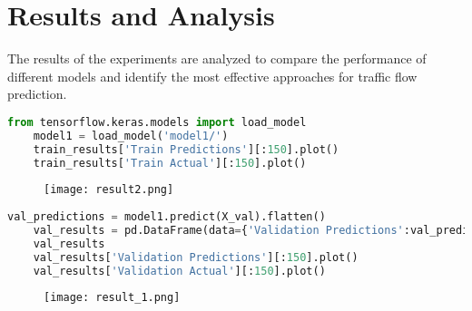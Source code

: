 \section{Results and Analysis}

The results of the experiments are analyzed to compare the performance of different models and identify the most effective approaches for traffic flow prediction.

\begin{lstlisting}[language=Python,caption={Performance Metrics},label={code:data}]
    from tensorflow.keras.models import load_model
    model1 = load_model('model1/')
    train_results['Train Predictions'][:150].plot()
    train_results['Train Actual'][:150].plot()
\end{lstlisting}



\begin{figure}[h!]
    \centering
    \texttt{[image: result2.png]}
\end{figure}


\begin{lstlisting}[language=Python,caption={Performance Metrics},label={code:data}]
    val_predictions = model1.predict(X_val).flatten()
    val_results = pd.DataFrame(data={'Validation Predictions':val_predictions, 'Validation Actual':y_val})
    val_results
    val_results['Validation Predictions'][:150].plot()
    val_results['Validation Actual'][:150].plot()
\end{lstlisting}

\begin{figure}[h!]
    \centering
    \texttt{[image: result\_1.png]}
\end{figure}
